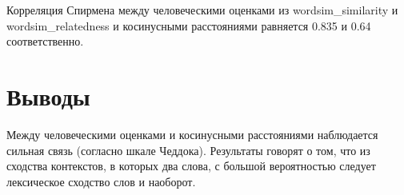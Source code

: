 \documentclass[14pt]{extreport}
\begin{document}
\indent Корреляция Спирмена между человеческими оценками из wordsim\_similarity
и wordsim\_relatedness и косинусными расстояниями равняется 0.835 и 0.64 соответственно.

\section*{Выводы}
Между человеческими оценками и косинусными расстояниями наблюдается сильная связь 
(согласно шкале Чеддока). Результаты говорят о том, что из сходства контекстов, в которых два слова, с большой вероятностью следует лексическое сходство слов и наоборот. 
\end{document}
